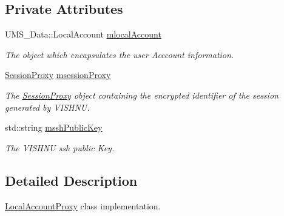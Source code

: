 \subsection*{Private Attributes}
\begin{DoxyCompactItemize}
\item 
\hypertarget{classLocalAccountProxy_a67fd64310588313e9e74ebd892af65b1}{
UMS\_\-Data::LocalAccount \hyperlink{classLocalAccountProxy_a67fd64310588313e9e74ebd892af65b1}{mlocalAccount}}
\label{classLocalAccountProxy_a67fd64310588313e9e74ebd892af65b1}

\begin{DoxyCompactList}\small\item\em The object which encapsulates the user Acccount information. \item\end{DoxyCompactList}\item 
\hypertarget{classLocalAccountProxy_a5d7a2885f95a007ac68dc7d5c585bdb1}{
\hyperlink{classSessionProxy}{SessionProxy} \hyperlink{classLocalAccountProxy_a5d7a2885f95a007ac68dc7d5c585bdb1}{msessionProxy}}
\label{classLocalAccountProxy_a5d7a2885f95a007ac68dc7d5c585bdb1}

\begin{DoxyCompactList}\small\item\em The \hyperlink{classSessionProxy}{SessionProxy} object containing the encrypted identifier of the session generated by VISHNU. \item\end{DoxyCompactList}\item 
\hypertarget{classLocalAccountProxy_a8c33a9bae468dd99acbaa5acef8b0d5e}{
std::string \hyperlink{classLocalAccountProxy_a8c33a9bae468dd99acbaa5acef8b0d5e}{msshPublicKey}}
\label{classLocalAccountProxy_a8c33a9bae468dd99acbaa5acef8b0d5e}

\begin{DoxyCompactList}\small\item\em The VISHNU ssh public Key. \item\end{DoxyCompactList}\end{DoxyCompactItemize}


\subsection{Detailed Description}
\hyperlink{classLocalAccountProxy}{LocalAccountProxy} class implementation. 

